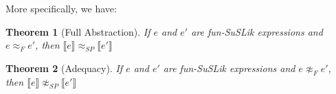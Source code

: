 \documentclass[10pt]{article}
\newtheorem{theorem}{Theorem}
\newcommand{\ra}{\ensuremath{\rightarrow}}
\newcommand{\sem} [1] {\llbracket#1\rrbracket}
\begin{document}
\noindent
More specifically, we have:

\begin{theorem}[Full Abstraction]
  If $e$ and $e'$ are fun-SuSLik expressions and $e \approx_F e'$, then $\sem{e} \approx_{SP} \sem{e'}$
\end{theorem}

\begin{theorem}[Adequacy]
  If $e$ and $e'$ are fun-SuSLik expressions and $e \not\approx_F e'$, then $\sem{e} \not\approx_{SP} \sem{e'}$
\end{theorem}





%
%
%
%
\end{document}
